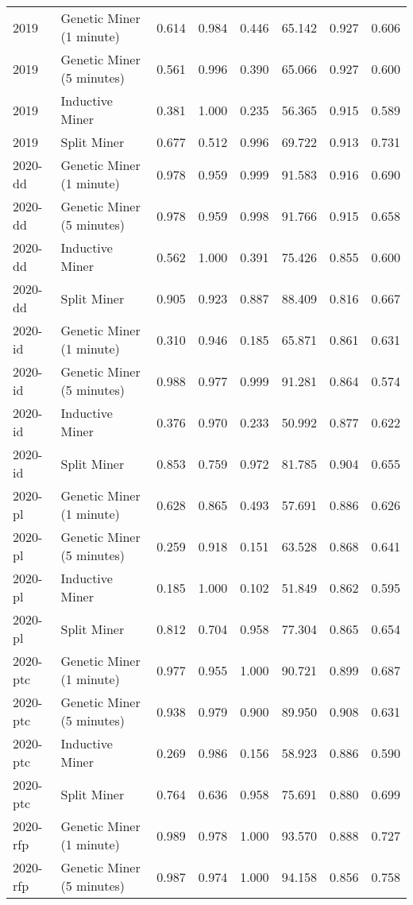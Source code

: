 \begin{tabular}{llrrrrrr}
2019 & Genetic Miner (1 minute) & 0.614 & 0.984 & 0.446 & 65.142 & 0.927 & 0.606 \\
2019 & Genetic Miner (5 minutes) & 0.561 & 0.996 & 0.390 & 65.066 & 0.927 & 0.600 \\
2019 & Inductive Miner & 0.381 & 1.000 & 0.235 & 56.365 & 0.915 & 0.589 \\
2019 & Split Miner & 0.677 & 0.512 & 0.996 & 69.722 & 0.913 & 0.731 \\
2020-dd & Genetic Miner (1 minute) & 0.978 & 0.959 & 0.999 & 91.583 & 0.916 & 0.690 \\
2020-dd & Genetic Miner (5 minutes) & 0.978 & 0.959 & 0.998 & 91.766 & 0.915 & 0.658 \\
2020-dd & Inductive Miner & 0.562 & 1.000 & 0.391 & 75.426 & 0.855 & 0.600 \\
2020-dd & Split Miner & 0.905 & 0.923 & 0.887 & 88.409 & 0.816 & 0.667 \\
2020-id & Genetic Miner (1 minute) & 0.310 & 0.946 & 0.185 & 65.871 & 0.861 & 0.631 \\
2020-id & Genetic Miner (5 minutes) & 0.988 & 0.977 & 0.999 & 91.281 & 0.864 & 0.574 \\
2020-id & Inductive Miner & 0.376 & 0.970 & 0.233 & 50.992 & 0.877 & 0.622 \\
2020-id & Split Miner & 0.853 & 0.759 & 0.972 & 81.785 & 0.904 & 0.655 \\
2020-pl & Genetic Miner (1 minute) & 0.628 & 0.865 & 0.493 & 57.691 & 0.886 & 0.626 \\
2020-pl & Genetic Miner (5 minutes) & 0.259 & 0.918 & 0.151 & 63.528 & 0.868 & 0.641 \\
2020-pl & Inductive Miner & 0.185 & 1.000 & 0.102 & 51.849 & 0.862 & 0.595 \\
2020-pl & Split Miner & 0.812 & 0.704 & 0.958 & 77.304 & 0.865 & 0.654 \\
2020-ptc & Genetic Miner (1 minute) & 0.977 & 0.955 & 1.000 & 90.721 & 0.899 & 0.687 \\
2020-ptc & Genetic Miner (5 minutes) & 0.938 & 0.979 & 0.900 & 89.950 & 0.908 & 0.631 \\
2020-ptc & Inductive Miner & 0.269 & 0.986 & 0.156 & 58.923 & 0.886 & 0.590 \\
2020-ptc & Split Miner & 0.764 & 0.636 & 0.958 & 75.691 & 0.880 & 0.699 \\
2020-rfp & Genetic Miner (1 minute) & 0.989 & 0.978 & 1.000 & 93.570 & 0.888 & 0.727 \\
2020-rfp & Genetic Miner (5 minutes) & 0.987 & 0.974 & 1.000 & 94.158 & 0.856 & 0.758 \\

\end{tabular}
